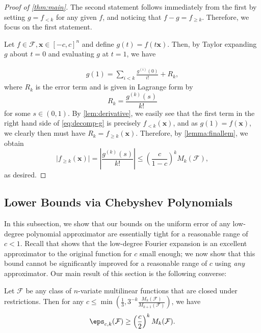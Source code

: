     \begin{proof}[Proof of \cref{thm:main}]
    The second statement follows immediately from the first by setting $g=f_{<k}$ for any given $f$, and noticing that $f-g=f_{\geq k}$. Therefore, we focus on the first statement.
    
Let $f\in \mathcal{F}, \mathbf{x}\in [-c,c]^n$ and define $g(t)=f(t\mathbf{x})$. Then, by Taylor expanding $g$ about $t=0$ and evaluating $g$ at $t=1$, we have

\begin{align} \label{eq:decomp-g}
    g(1)=\sum_{i<k} \frac{g^{(i)}(0)}{i!} +R_k, 
\end{align}
where $R_k$ is the error term and is given in Lagrange form by
\begin{equation*}
    R_k = \frac{g^{(k)}(s)}{k!}
\end{equation*}
for some $s\in (0,1)$. By \cref{lem:derivative}, we easily see that the first term in the right hand side of \cref{eq:decomp-g} is precisely $f_{<k}(\mathbf{x})$, and as $g(1)=f(\mathbf{x})$, we clearly then must have $R_k = f_{\geq k}(\mathbf{x})$.  Therefore, by \cref{lemma:finallem}, we obtain
\begin{equation*}
    \vert f_{\geq k}(\mathbf{x})\vert = \left\vert\frac{g^{(k)}(s)}{k!}\right\vert \leq \left(\frac{c}{1-c}\right)^k M_k(\mathcal{F}),
\end{equation*}
as desired.
\end{proof}

\subsection{Lower Bounds via Chebyshev Polynomials}

In this subsection, we show that our bounds on the uniform error of any low-degree polynomial approximator are essentially tight for a reasonable range of $c<1$. Recall that  shows that the low-degree Fourier expansion is an excellent approximator to the original function for $c$ small enough; we now show that this bound cannot be significantly improved for a reasonable range of $c$ using \emph{any} approximator. Our main result of this section is the following converse:

\begin{THM}
\label{thm:cheby}
Let $\mathcal{F}$ be any class of $n$-variate multilinear functions that are closed under restrictions.  Then for any $c\leq \min\left(\frac{1}{3}, 3^{-k} \frac{M_k(\mathcal{F})}{M_{k+1}(\mathcal{F})}\right)$, we have
\begin{equation*}
    \eps_{c,k}(\mathcal{F}) \geq \left(\frac{c}{2}\right)^k M_k(\mathcal{F}).
\end{equation*}
\end{THM}

